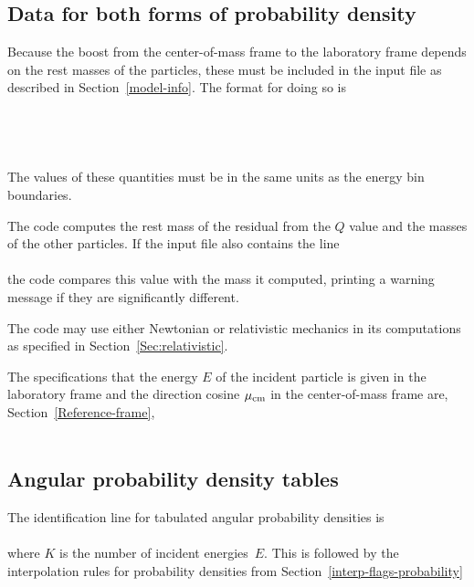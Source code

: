 \subsection{Data for both forms of probability density}
Because the boost from the center-of-mass frame to the laboratory
frame depends on the rest masses of the particles, these must be included
in the input file as described in Section~\ref{model-info}.  The format for doing so is\\
   \\
  \\
  \\
  \\
The values of these quantities must be in the same units as
the energy bin boundaries.

The code computes the rest mass of the residual from the $Q$ value and
the masses of the other particles.  If the input file also contains the line\\
 \\
the code compares this value with the mass it computed, printing
a warning message if they are significantly different.

The code may use either Newtonian or relativistic mechanics in its
computations as specified in Section~\ref{Sec:relativistic}.

The specifications that the energy $E$ of the incident particle is given in the laboratory
frame and the direction cosine $\mu_{\text{cm}}$ in the center-of-mass frame are,
Section~\ref{Reference-frame},\\
  \\

\subsection{Angular probability density tables}
The identification line for tabulated angular probability densities
is\\
  \\
where $K$ is the number of incident energies~$E$.
This is followed by the interpolation rules for probability
densities from Section~\ref{interp-flags-probability}\\
  \\

